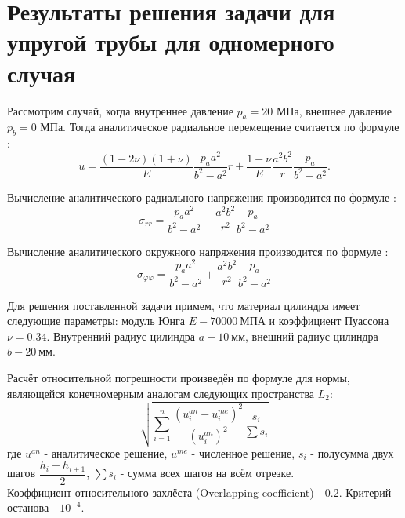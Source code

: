 \documentclass[a4paper,14pt]{extarticle}
\begin{document}

\newpage
\section{Результаты решения задачи для упругой трубы для одномерного случая}

Рассмотрим случай, когда внутреннее давление $p_a=20$ МПа, внешнее давление $p_b=0$ МПа. Тогда аналитическое радиальное перемещение считается по формуле :
\begin{equation}\label{perem}
u=\frac{\left(1-2\nu\right)\left(1+\nu\right)}{E} \frac{p_a a^2}{b^2-a^2}r+\frac{1+\nu}{E}\frac{a^2 b^2}{r}\frac{p_a}{b^2-a^2}.
\end{equation}

Вычисление аналитического радиального напряжения производится по формуле :
\begin{equation}
\sigma_{rr}=\frac{p_a a^2}{b^2-a^2}-\frac{a^2 b^2}{r^2}\frac{p_a}{b^2 -a^2}
\end{equation}

Вычисление аналитического окружного напряжения производится по формуле :
\begin{equation}
\sigma_{\varphi\varphi}=\frac{p_a a^2}{b^2-a^2}+\frac{a^2 b^2}{r^2}\frac{p_a}{b^2 -a^2}
\end{equation}	

Для решения поставленной задачи примем, что материал цилиндра имеет следующие параметры: модуль Юнга $E - 70000 \:\text{МПА}$ и коэффициент Пуассона $\nu=0.34$. Внутренний радиус цилиндра $a - 10 \:\text{мм}$, внешний радиус цилиндра $b - 20 \:\text{мм}$.

Расчёт относительной погрешности произведён по формуле для нормы, являющейся конечномерным аналогам следующих пространства $L_2$:
\begin{equation}\label{Error_Ot_L2}
\sqrt{\sum_{i=1}^{n} \dfrac{ (u_i^{an}-u_i^{me})^2}{ (u_i^{an})^2 }\dfrac{s_{i}}{\sum{s_i}}}
\end{equation}
где $u^{an}$ - аналитическое решение, $u^{me}$ - численное решение, $s_i$ - полусумма двух шагов $\dfrac{h_i+h_{i+1}}{2}$, $\sum{s_i}$ - сумма всех шагов на всём отрезке. 
\\
Коэффициент относительного захлёста (Overlapping coefficient) - 0.2. Критерий останова - $10^{-4}$.
\end{document}
